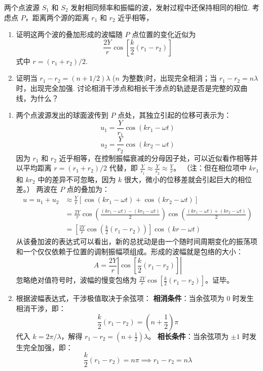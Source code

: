 \begin{exercise}\label{ex:8.17}
两个点波源 $S_1$ 和 $S_2$ 发射相同频率和振幅的波，发射过程中还保持相同的相位. 考虑点 $P$，距离两个源的距离 $r_1$ 和 $r_2$ 近乎相等，
\begin{enumerate}
  \item[(a)] 证明这两个波的叠加形成的波幅随 $P$ 点位置的变化近似为
  $$ \frac{2Y}{r} \cos\left[ \frac{k}{2} (r_1 - r_2) \right] $$
  式中 $r = (r_1 + r_2)/2$.
  \item[(b)] 证明当 $r_1 - r_2 = (n + 1/2)\lambda$ ($n$ 为整数)时，出现完全相消；当 $r_1 - r_2 = n\lambda$ 时，出现完全加强. 讨论相消干涉点和相长干涉点的轨迹是否是完整的双曲线，为什么？
\end{enumerate}
\end{exercise}
\begin{solution}
\begin{enumerate}
    \item[(a)] 两个点波源发出的球面波传到 $P$ 点处，其独立引起的位移可表示为：
    $$ u_1 = \frac{Y}{r_1} \cos(kr_1 - \omega t) $$
    $$ u_2 = \frac{Y}{r_2} \cos(kr_2 - \omega t) $$
    因为 $r_1$ 和 $r_2$ 近乎相等，在控制振幅衰减的分母因子处，可以近似看作相等并以平均距离 $r = (r_1+r_2)/2$ 代替，即 $\frac{Y}{r_1} \approx \frac{Y}{r_2} \approx \frac{Y}{r}$。
    （注：但在相位项中 $k r_1$ 和 $k r_2$ 中的差异不可忽略，因为 $k$ 很大，微小的位移差就会引起巨大的相位差。）
    两波在 $P$ 点的叠加为：
    \begin{align*}
        u = u_1 + u_2 &\approx \frac{Y}{r} \left[ \cos(kr_1 - \omega t) + \cos(kr_2 - \omega t) \right] \\
        &= \frac{2Y}{r} \cos\left( \frac{(kr_1 - \omega t) - (kr_2 - \omega t)}{2} \right) \cos\left( \frac{(kr_1 - \omega t) + (kr_2 - \omega t)}{2} \right) \\
        &= \left[ \frac{2Y}{r} \cos\left( \frac{k}{2}(r_1 - r_2) \right) \right] \cos\left( kr - \omega t \right)
    \end{align*}
    从该叠加波的表达式可以看出，新的总扰动是由一个随时间周期变化的振荡项和一个仅仅依赖于位置的调制振幅项组成。形成的波幅就是包络的大小：
    $$ A = \frac{2Y}{r} \left| \cos\left[ \frac{k}{2} (r_1 - r_2) \right] \right| $$
    忽略绝对值符号时，波幅的慢变包络为 $\frac{2Y}{r} \cos\left[ \frac{k}{2} (r_1 - r_2) \right]$。证毕。

    \item[(b)] 根据波幅表达式，干涉极值取决于余弦项：
    \textbf{相消条件}：当余弦项为 0 时发生相消干涉，即：
    $$ \frac{k}{2} (r_1 - r_2) = \left( n + \frac{1}{2} \right) \pi $$
    代入 $k = 2\pi/\lambda$，解得 $r_1 - r_2 = \left( n + \frac{1}{2} \right) \lambda$。
    \textbf{相长条件}：当余弦项为 $\pm 1$ 时发生完全加强，即：
    $$ \frac{k}{2} (r_1 - r_2) = n \pi \implies r_1 - r_2 = n \lambda $$
    

\end{enumerate}
\end{solution}
